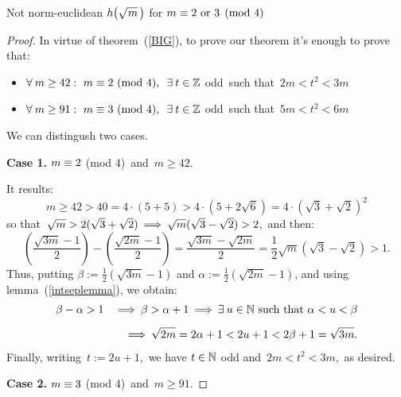 \begin{subsection}{Not norm-euclidean $\hh{m}$ for %
                   $m \equiv 2 \text{ or } 3 \pmod 4$}
\begin{proof}
%
In virtue of theorem~(\ref{BIG}), to prove our theorem
it's enough to prove that:

\begin{itemize}

\item
$\forall\: m \geq 42:\ m \congruent 2\ (\mathrm{mod}\ 4),
\,\ \exists\: t \in \Z$ odd\, such that\, $2m < t^2 <3m$

\item
$\forall\: m \geq 91:\ m \congruent 3\ (\mathrm{mod}\ 4),
\,\ \exists\: t \in \Z$ odd\, such that\, $5m < t^2 < 6m$

\end{itemize}
%
We can distingush two cases.

\medskip
\textbf{Case 1. } $m \equiv 2$ (mod $4$)\, and\,
$m \geq 42$.

\smallskip
It results:
$$
m \geq 42 > 40 = 4 \cdot (5 + 5) > 4 \cdot
\left(5 + 2\sqrt{6}\right) = 4 \cdot \left(\sqrt{3} +
\sqrt{2}\right)^2
$$
so that\, $\sqrt{m} > 2(\sqrt{3} + \sqrt{2}) \:\Longrightarrow\:
\sqrt{m}(\sqrt{3} - \sqrt{2}) > 2$,\, and then:
$$
\left(\frac{\sqrt{3m} - 1}{2}\right) -
\left(\frac{\sqrt{2m} - 1}{2}\right) =
\frac{\sqrt{3m} - \sqrt{2m}}{2} = 
\frac{1}{2}\sqrt{m} \left(\sqrt{3}-\sqrt{2}\right) > 1.
$$
%
Thus, putting
$\beta:= \frac{1}{2} \left(\sqrt{3m} - 1\right)$
and
$\alpha:= \frac{1}{2} \left(\sqrt{2m} - 1\right)$,
and using lemma~(\ref{intseplemma}), we obtain:
\begin{eqnarray*}
& \beta - \alpha > 1 & \:\Longrightarrow\: \beta > \alpha + 1 \:\Longrightarrow\:
\exists\: u \in \mathbb{N}\ \textrm{such that}\ \alpha < u <
\beta
\\[5pt]
& & \:\Longrightarrow\: \sqrt{2m} = 2 \alpha + 1 < 2u + 1 <
2 \beta + 1 = \sqrt{3m}.
\end{eqnarray*}
Finally, writing\, $t:= 2u + 1$,\, we have $t \in \mathbb{N}$ odd and
\,$2m < t^2 < 3m$,\, as desired.


\medskip
\textbf{Case 2. } $m \equiv 3$ (mod $4$)\, and\,
$m \geq 91$.


\end{proof}
\end{subsection}
